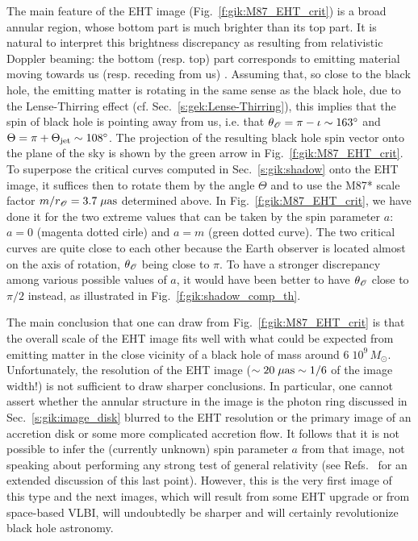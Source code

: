 The main feature of the EHT image (Fig.~\ref{f:gik:M87_EHT_crit}) is a broad annular region, whose bottom part is much brighter
than its top part. It is natural to interpret this brightness discrepancy as resulting from relativistic Doppler beaming: the bottom (resp. top) part corresponds to emitting material
moving towards us (resp. receding from us) \cite{EHT19e}.
Assuming that, so close to the black hole, the emitting
matter is rotating in the same sense as the black hole, due to the
Lense-Thirring effect (cf. Sec.~\ref{s:gek:Lense-Thirring}),
this implies that the
spin of black hole is pointing away from us, i.e. that
$\theta_{\mathscr{O}} = \pi - \iota \sim  163^\circ$ and $\Theta = \pi + \Theta_{\rm jet} \sim 108^\circ$.
The projection of the resulting black hole spin vector onto the plane of the sky is shown by the green
arrow in Fig.~\ref{f:gik:M87_EHT_crit}.
To superpose the critical curves computed in Sec.~\ref{s:gik:shadow} onto the EHT image,
it suffices then to rotate them by the angle $\Theta$ and to use the M87* scale
factor $m/r_{\mathscr{O}} = 3.7 \; \mu{\rm as}$ determined above.
In Fig.~\ref{f:gik:M87_EHT_crit}, we have done it
for the two extreme values that can be taken by the spin parameter $a$: $a=0$ (magenta dotted cirle) and $a=m$ (green dotted curve).
The two critical curves are quite close to each other because the Earth observer is located
almost on the axis of rotation, $\theta_{\mathscr{O}}$ being close to $\pi$. To have a stronger
discrepancy among various possible values of $a$, it would have been
better to have $\theta_{\mathscr{O}}$ close to $\pi/2$ instead, as illustrated in  Fig.~\ref{f:gik:shadow_comp_th}.

The main conclusion that one can draw from Fig.~\ref{f:gik:M87_EHT_crit}
is that the overall scale of the EHT image fits well with what could be
expected from emitting matter in the close vicinity of a black hole
of mass around $6\; 10^9\, M_\odot$. Unfortunately, the resolution
of the EHT image ($\sim 20 \; \mu{\rm as} \sim 1/6$ of the image width!)
is not sufficient to draw sharper conclusions.
In particular,
one cannot assert whether the annular structure in the image
is the photon ring discussed in Sec.~\ref{s:gik:image_disk} blurred to the
EHT resolution or the primary image of an accretion disk
or some more complicated accretion flow.
It follows that it is not possible to infer the (currently unknown) spin parameter $a$ from that image,
not speaking about performing any strong test of general relativity
(see Refs.~\cite{Grall21,GlampP21} for an extended discussion of this last point).
However, this is the very first image of this type and the next images,
which will result from some EHT upgrade or from space-based VLBI,
will undoubtedly be sharper and will certainly revolutionize black hole astronomy.


